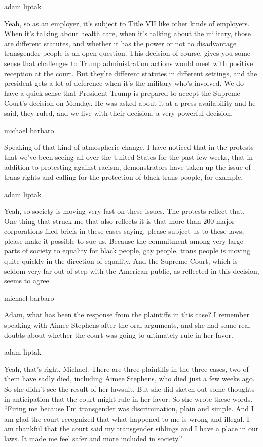 adam liptak

Yeah, so as an employer, it's subject to Title VII like other kinds of
employers. When it's talking about health care, when it's talking about
the military, those are different statutes, and whether it has the power
or not to disadvantage transgender people is an open question. This
decision of course, gives you some sense that challenges to Trump
administration actions would meet with positive reception at the court.
But they're different statutes in different settings, and the president
gets a lot of deference when it's the military who's involved. We do
have a quick sense that President Trump is prepared to accept the
Supreme Court's decision on Monday. He was asked about it at a press
availability and he said, they ruled, and we live with their decision, a
very powerful decision.

michael barbaro

Speaking of that kind of atmospheric change, I have noticed that in the
protests that we've been seeing all over the United States for the past
few weeks, that in addition to protesting against racism, demonstrators
have taken up the issue of trans rights and calling for the protection
of black trans people, for example.

adam liptak

Yeah, so society is moving very fast on these issues. The protests
reflect that. One thing that struck me that also reflects it is that
more than 200 major corporations filed briefs in these cases saying,
please subject us to these laws, please make it possible to sue us.
Because the commitment among very large parts of society to equality for
black people, gay people, trans people is moving quite quickly in the
direction of equality. And the Supreme Court, which is seldom very far
out of step with the American public, as reflected in this decision,
seems to agree.

michael barbaro

Adam, what has been the response from the plaintiffs in this case? I
remember speaking with Aimee Stephens after the oral arguments, and she
had some real doubts about whether the court was going to ultimately
rule in her favor.

adam liptak

Yeah, that's right, Michael. There are three plaintiffs in the three
cases, two of them have sadly died, including Aimee Stephens, who died
just a few weeks ago. So she didn't see the result of her lawsuit. But
she did sketch out some thoughts in anticipation that the court might
rule in her favor. So she wrote these words. ``Firing me because I'm
transgender was discrimination, plain and simple. And I am glad the
court recognized that what happened to me is wrong and illegal. I am
thankful that the court said my transgender siblings and I have a place
in our laws. It made me feel safer and more included in society.''

